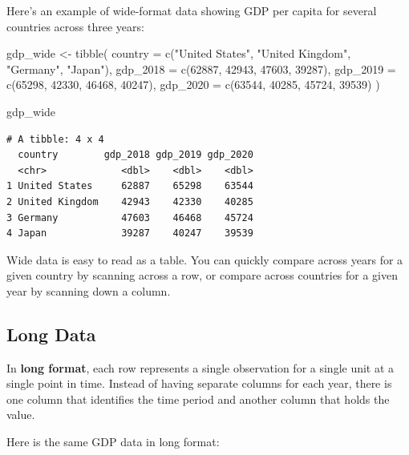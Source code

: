 \documentclass[
  letterpaper,
  DIV=11,
  numbers=noendperiod]{scrreprt}
\newenvironment{Shaded}{\begin{snugshade}}{\end{snugshade}}
\newcommand{\AttributeTok}[1]{\textcolor[rgb]{0.40,0.45,0.13}{#1}}
\newcommand{\DecValTok}[1]{\textcolor[rgb]{0.68,0.00,0.00}{#1}}
\newcommand{\FunctionTok}[1]{\textcolor[rgb]{0.28,0.35,0.67}{#1}}
\newcommand{\NormalTok}[1]{\textcolor[rgb]{0.00,0.23,0.31}{#1}}
\newcommand{\OtherTok}[1]{\textcolor[rgb]{0.00,0.23,0.31}{#1}}
\newcommand{\StringTok}[1]{\textcolor[rgb]{0.13,0.47,0.30}{#1}}
\begin{document}
Here's an example of wide-format data showing GDP per capita for several
countries across three years:

\begin{Shaded}
\begin{Highlighting}[]
\NormalTok{gdp\_wide }\OtherTok{\textless{}{-}} \FunctionTok{tibble}\NormalTok{(}
  \AttributeTok{country =} \FunctionTok{c}\NormalTok{(}\StringTok{"United States"}\NormalTok{, }\StringTok{"United Kingdom"}\NormalTok{, }\StringTok{"Germany"}\NormalTok{, }\StringTok{"Japan"}\NormalTok{),}
  \AttributeTok{gdp\_2018 =} \FunctionTok{c}\NormalTok{(}\DecValTok{62887}\NormalTok{, }\DecValTok{42943}\NormalTok{, }\DecValTok{47603}\NormalTok{, }\DecValTok{39287}\NormalTok{),}
  \AttributeTok{gdp\_2019 =} \FunctionTok{c}\NormalTok{(}\DecValTok{65298}\NormalTok{, }\DecValTok{42330}\NormalTok{, }\DecValTok{46468}\NormalTok{, }\DecValTok{40247}\NormalTok{),}
  \AttributeTok{gdp\_2020 =} \FunctionTok{c}\NormalTok{(}\DecValTok{63544}\NormalTok{, }\DecValTok{40285}\NormalTok{, }\DecValTok{45724}\NormalTok{, }\DecValTok{39539}\NormalTok{)}
\NormalTok{)}

\NormalTok{gdp\_wide}
\end{Highlighting}
\end{Shaded}

\begin{verbatim}
# A tibble: 4 x 4
  country        gdp_2018 gdp_2019 gdp_2020
  <chr>             <dbl>    <dbl>    <dbl>
1 United States     62887    65298    63544
2 United Kingdom    42943    42330    40285
3 Germany           47603    46468    45724
4 Japan             39287    40247    39539
\end{verbatim}

Wide data is easy to read as a table. You can quickly compare across
years for a given country by scanning across a row, or compare across
countries for a given year by scanning down a column.

\subsection{Long Data}\label{long-data}

In \textbf{long format}, each row represents a single observation for a
single unit at a single point in time. Instead of having separate
columns for each year, there is one column that identifies the time
period and another column that holds the value.

Here is the same GDP data in long format:
\end{document}
